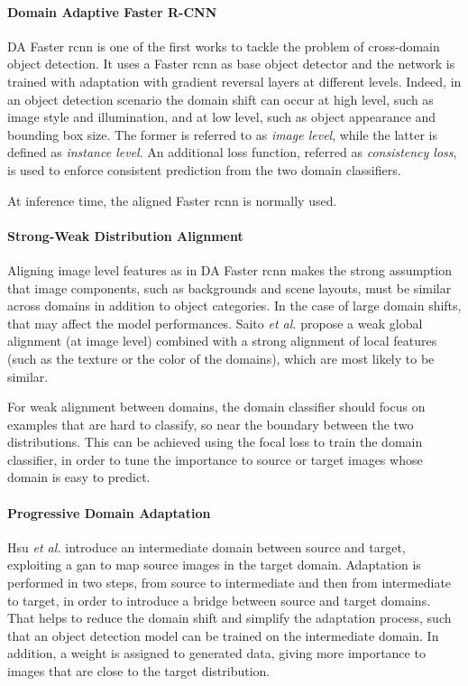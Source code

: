 \documentclass[%
    corpo=12pt,
    twoside,
    stile=classica,   
    tipotesi=magistrale,
    evenboxes,
    english,
	numerazioneromana,
]{toptesi}
\begin{document}
\paragraph{Domain Adaptive Faster R-CNN}\label{sec:dafrcnn}
DA Faster \acrshort{rcnn}\cite{chen2018domain} is one of the first works to tackle the problem of cross-domain object detection. It uses a Faster \acrshort{rcnn} as base object detector and the network is trained with adaptation with gradient reversal layers at different levels. Indeed, in an object detection scenario the domain shift can occur at high level, such as image style and illumination, and at low level, such as object appearance and bounding box size. The former is referred to as \textit{image level}, while the latter is defined as \textit{instance level}. An additional loss function, referred as \textit{consistency loss}, is used to enforce consistent prediction from the two domain classifiers.

At inference time, the aligned Faster \gls{rcnn} is normally used.

\paragraph{Strong-Weak Distribution Alignment}
Aligning image level features as in DA Faster \acrshort{rcnn} makes the strong assumption that image components, such as backgrounds and scene layouts, must be similar across domains in addition to object categories. In the case of large domain shifts, that may affect the model performances. Saito \emph{et al.}\cite{saito2019strongweak} propose a weak global alignment (at image level) combined with a strong alignment of local features (such as the texture or the color of the domains), which are most likely to be similar.

For weak alignment between domains, the domain classifier should focus on examples that are hard to classify, so near the boundary between the two distributions. This can be achieved using the focal loss to train the domain classifier, in order to tune the importance to source or target images whose domain is easy to predict.

\paragraph{Progressive Domain Adaptation}
Hsu \emph{et al.}\cite{hsu2019progressive} introduce an intermediate domain between source and target, exploiting a \gls{gan} to map source images in the target domain. Adaptation is performed in two steps, from source to intermediate and then from intermediate to target, in order to introduce a bridge between source and target domains. That helps to reduce the domain shift and simplify the adaptation process, such that an object detection model can be trained on the intermediate domain. In addition, a weight is assigned to generated data, giving more importance to images that are close to the target distribution.
\end{document}
